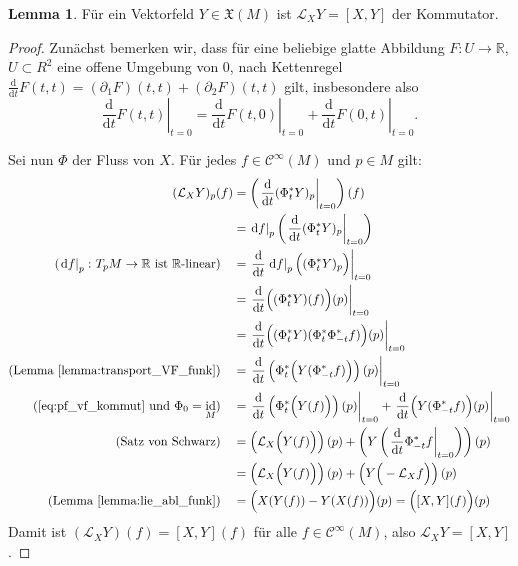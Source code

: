 \documentclass[a4paper]{scrreprt}
\numberwithin{equation}{chapter}
\newcommand{\D}{\mathrm{d}}
\DeclareMathOperator{\id}{id}
\newcommand{\sC}{\mathcal{C}^{\infty}}
\theoremstyle{definition}
\newtheorem{lemma}[defn]{Lemma}
\begin{document}
\begin{lemma}
	Für ein Vektorfeld $Y \in \mathfrak X(M)$ ist $\mathcal L_X Y = [X,Y]$ der Kommutator.

	\begin{proof}
		Zunächst bemerken wir, dass für eine beliebige glatte Abbildung $F \colon U \to \mathbb R$, $U \subset R^2$ eine offene Umgebung von 0, nach Kettenregel $\frac{\D}{\D t} F(t,t) = (\partial_1 F)(t,t) + (\partial_2 F)(t,t)$ gilt, insbesondere also
		\begin{equation} \label{eq:pf_vf_kommut} \tag{$*$}
			\left.\frac{\D}{\D t} F(t,t)\right|_{t=0} = \left.\frac{\D}{\D t} F(t,0)\right|_{t=0} + \left.\frac{\D}{\D t} F(0,t)\right|_{t=0}.
		\end{equation}

		Sei nun $\Phi$ der Fluss von $X$. Für jedes $f\in \sC(M)$ und $p\in M$ gilt:
		\begingroup
		\allowdisplaybreaks
		\begin{align*}
			(\mathcal L_X Y)_p(f) &= \left(\left.\frac{\D}{\D t}(\Phi_t^* Y)_p\right|_{t=0}\right)(f)\\
			&= \left.\D f\right|_p \left(\left.\frac{\D}{\D t}(\Phi_t^* Y)_p\right|_{t=0}\right)\\
			\text{($\left.\D f\right|_p\colon T_pM \to \mathbb R$ ist $\mathbb R$-linear)} \quad &= \left.\frac{\D}{\D t}\left.\D f\right|_p \Big((\Phi_t^* Y)_p\Big)\right|_{t=0}\\
			&= \left.\frac{\D}{\D t} \Big((\Phi_t^* Y) (f)\Big)(p)\right|_{t=0}\\
			&= \left.\frac{\D}{\D t}\Big((\Phi_t^* Y)(\Phi_t^* \Phi_{-t}^*f)\Big)(p)\right|_{t=0}\\
			\text{(Lemma \ref{lemma:transport_VF_funk})} \quad &= \left.\frac{\D}{\D t} \left(\Phi_t^* \Big(Y(\Phi_{-t}^*f)\Big)\right)(p) \right|_{t=0}\\
			\text{(\eqref{eq:pf_vf_kommut} und $\Phi_0 = \id_M$)} \quad &= \left.\frac{\D}{\D t}\left(\Phi_t^* \Big(Y(f)\Big)\right) (p) \right|_{t=0} + \left.\frac{\D}{\D t} \Big(Y(\Phi_{-t}^*f)\Big) (p) \right|_{t=0}\\
			\text{(Satz von Schwarz)} \quad &= \left(\mathcal L_X \Big(Y(f)\Big)\right)(p) + \left(Y\left( \left.\frac{\D}{\D t} \Phi_{-t}^*f \right|_{t=0} \right)\right)(p)\\
			&= \left(\mathcal L_X \Big(Y(f)\Big)\right)(p) + \left(Y\Big( - \mathcal L_X f \Big)\right)(p)\\
			\text{(Lemma \ref{lemma:lie_abl_funk})} \quad &= \Big(X(Y(f)) - Y(X(f))\Big)(p) = \Big([X,Y](f)\Big)(p)
		\end{align*}%
		\endgroup
		Damit ist $(\mathcal L_X Y)(f) = [X,Y](f)$ für alle $f\in\sC(M)$, also $\mathcal L_X Y = [X,Y]$.
	\end{proof}
\end{lemma}
\end{document}
